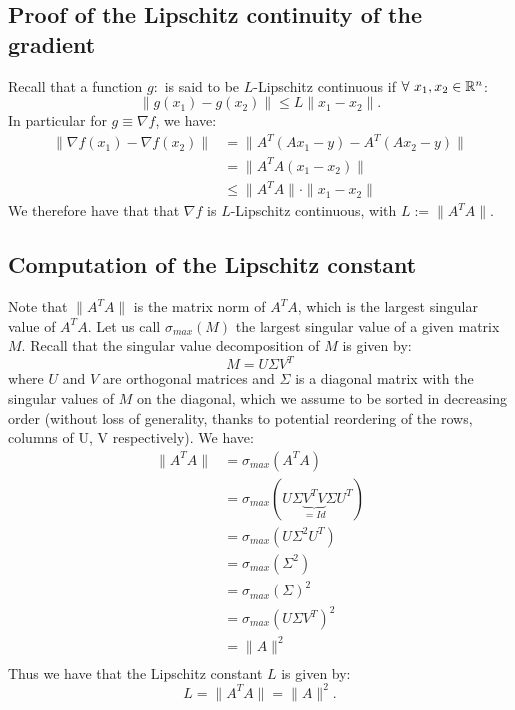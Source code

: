 \documentclass[12pt]{article}
\begin{document}
\subsection{Proof of the Lipschitz continuity of the gradient}
Recall that a function $g: $ is said to be $L$-Lipschitz continuous if $\forall\ x_1, x_2 \in \mathbb{R}^n$:
\begin{equation}
  \|g(x_1) - g(x_2)\| \leq L \|x_1 - x_2\|.
\end{equation}
In particular for $g \equiv \nabla f$, we have:
\begin{align*}
  \| \nabla f (x_1) - \nabla f (x_2) \|
   & = \| A^T(Ax_1 - y) - A^T(Ax_2 - y) \|  \\
   & = \| A^T A(x_1 - x_2) \|               \\
   & \leq \| A^T A \| \cdot \| x_1 - x_2 \|
\end{align*}
We therefore have that that $\nabla f$ is $L$-Lipschitz continuous, with $L := \| A^T A \|$.

\subsection{Computation of the Lipschitz constant}
Note that $\| A^T A \|$ is the matrix norm of $A^T A$, which is the largest singular value of $A^T A$. Let us call $\sigma_{max}(M)$ the largest singular value of a given matrix $M$. Recall that the singular value decomposition of $M$ is given by:
\begin{equation}
  M = U \Sigma V^T
\end{equation}
where $U$ and $V$ are orthogonal matrices and $\Sigma$ is a diagonal matrix with the singular values of $M$ on the diagonal, which we assume to be sorted in decreasing order (without loss of generality, thanks to potential reordering of the rows, columns of U, V respectively). We have:
\begin{align*}
  \| A^T A \|
   & = \sigma_{max}(A^T A)                                        \\
   & = \sigma_{max}(U \Sigma \underbrace{V^T V}_{=Id} \Sigma U^T) \\
   & = \sigma_{max}(U \Sigma^2 U^T)                               \\
   & = \sigma_{max}(\Sigma^2)                                     \\
   & = \sigma_{max}(\Sigma)^2                                     \\
   & = \sigma_{max}(U \Sigma V^T)^2                               \\
   & = \| A \| ^2                                                 \\
\end{align*}
Thus we have that the Lipschitz constant $L$ is given by:
$$
  L = \| A^T A \| = \| A \| ^2.
$$
\end{document}
